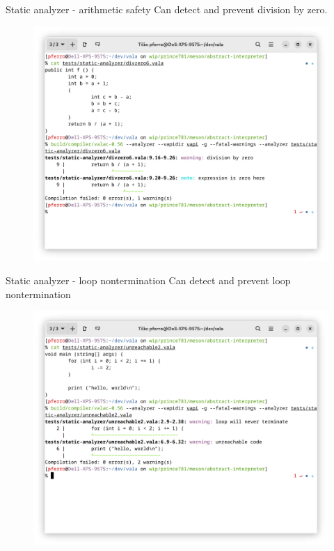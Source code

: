 \documentclass[t]{beamer}
\begin{document}
\begin{frame}[c]{Static analyzer - arithmetic safety}
Can detect and prevent division by zero.

\begin{figure}
    \begin{center}
        \includegraphics[scale=.12]{res/static-analyzer-divzero.png}
    \end{center}
\end{figure}
\end{frame}

\begin{frame}[c]{Static analyzer - loop nontermination}
Can detect and prevent loop nontermination

\begin{figure}
    \begin{center}
        \includegraphics[scale=.12]{res/static-analyzer-loop-nontermination.png}
    \end{center}
\end{figure}
\end{frame}
\end{document}
